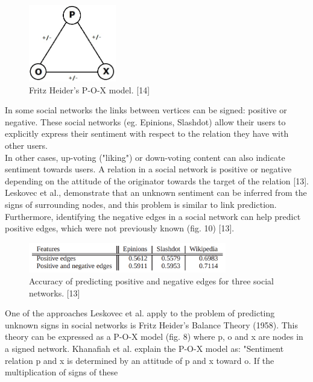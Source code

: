 \documentclass[conference,letterpaper]{IEEEtran}
\begin{document}
\begin{center}
\begin{figure}[hb]
\centering
\includegraphics[width=1.5in]{pox}
\caption{
Fritz Heider's P-O-X model. [14]
}
\label{fig_sim8}
\end{figure}
\end{center}
In some social networks the links between vertices can be signed: positive or negative. These social networks
(eg. Epinions, Slashdot) allow their users to explicitly express their sentiment with respect to the relation
they have with other users.\\
In other cases, up-voting ("liking") or down-voting content can also indicate sentiment towards users.
A relation in a social network is positive or negative depending on the attitude of the originator towards the
target of the relation [13]. Leskovec et al., demonstrate that an unknown sentiment can be inferred from the
signs of surrounding nodes, and this problem is similar to link prediction. Furthermore, identifying the
negative edges in a social network can help predict positive edges, which were not previously known (fig. 10) [13]. \\
\begin{center}
\begin{figure}[hb]
\centering
\includegraphics[width=3.4in]{predicting_positive}
\caption{
Accuracy of predicting positive and negative edges for three social networks. [13]
}
\label{fig_sim9}
\end{figure}
\end{center}
One of the approaches Leskovec et al. apply to the problem of predicting unknown signs in social networks
is Fritz Heider's Balance Theory (1958). This theory can be expressed as a P-O-X model (fig. 8)
where p, o and x are nodes in a signed network. Khanafiah et al. explain the P-O-X model as: "Sentiment
relation p and x is determined by an attitude of p and x toward o. If the multiplication of signs of these
\end{document}
